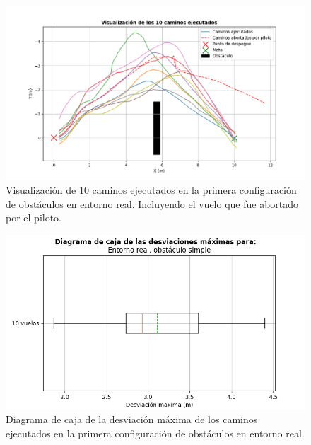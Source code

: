 \begin{figure}[H]
    \centering
    \includegraphics[scale=0.55]{partes/img/real-1-single-graph-all.png}
    \caption[Visualización de 10 caminos ejecutados en la primera configuración de obstáculos en entorno real.]{Visualización de 10 caminos ejecutados en la primera configuración de obstáculos en entorno real. Incluyendo el vuelo que fue abortado por el piloto.}
    \label{real-1-single-graph}
\end{figure}

\begin{figure}[H]
    \centering
    \includegraphics[scale=0.7]{partes/img/real-1-single-box.png}
    \caption[Diagrama de caja de la desviación máxima de los caminos ejecutados en la primera configuración de obstáculos en entorno real.]{Diagrama de caja de la desviación máxima de los caminos ejecutados en la primera configuración de obstáculos en entorno real.}
    \label{real-1-single-box}
\end{figure}

